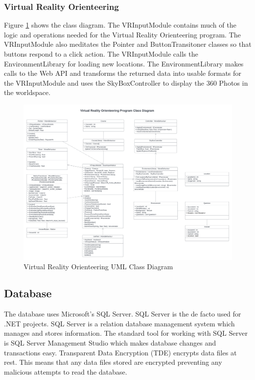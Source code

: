 \subsubsection{Virtual Reality Orienteering}

Figure \ref{Virtual Reality Orienteering UML Class Diagram} shows the class diagram. The VRInputModule contains much of the logic and operations needed for the Virtual Reality Orienteering program. The VRInputModule also meditates the Pointer and ButtonTransitoner classes so that buttons respond to a click action. The VRInputModule calls the EnvironmentLibrary for loading new locations. The EnvironmentLibrary makes calls to the Web API and transforms the returned data into usable formats for the VRInputModule and uses the SkyBoxController to display the 360 Photos in the worldspace. 

\begin{figure}[htb]
	\centering
	\includegraphics[width=.9\textwidth]{Design/assets/vr-class-diagram.png}
	\caption[Virutal Reality Orienteering UML Class Diagram]{\label{Virtual Reality Orienteering UML Class Diagram}Virtual Reality Orienteering UML Class Diagram}
\end{figure}

\subsection{Database}
The database uses Microsoft's SQL Server. SQL Server is the de facto used for .NET projects.  SQL Server is a relation database management system which manages and stores information. The standard tool for working with SQL Server is SQL Server Management Studio which makes database changes and transactions easy. Transparent Data Encryption (TDE) encrypts data files at rest. This means that any data files stored are encrypted preventing any malicious attempts to read the database.
\clearpage
